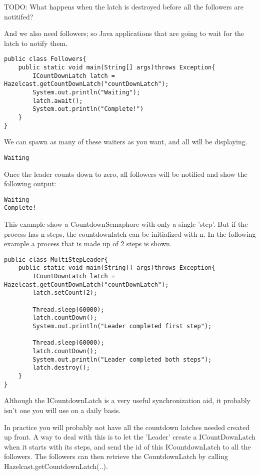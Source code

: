 TODO: What happens when the latch is destroyed before all the followers are notitifed?

And we also need followers; so Java applications that are going to wait for the 
latch to notify them.

\begin{verbatim}
public class Followers{
    public static void main(String[] args)throws Exception{
        ICountDownLatch latch = Hazelcast.getCountDownLatch("countDownLatch");
        System.out.println("Waiting");
        latch.await();
        System.out.println("Complete!")
    }
}
\end{verbatim}
We can spawn as many of these waiters as you want, and all will be displaying.

\begin{verbatim}
Waiting
\end{verbatim}

Once the leader counts down to zero, all followers will be notified and show the following output:

\begin{verbatim}
Waiting
Complete!
\end{verbatim}

This example show a CountdownSemaphore with only a single 'step'. But if the process has n steps,
the countdownlatch can be initialized with n. In the following example a process that is made up of 2 steps is shown.

\begin{verbatim}
public class MultiStepLeader{
    public static void main(String[] args)throws Exception{
        ICountDownLatch latch = Hazelcast.getCountDownLatch("countDownLatch");
        latch.setCount(2);

        Thread.sleep(60000); 
        latch.countDown();
        System.out.println("Leader completed first step");
        
        Thread.sleep(60000); 
        latch.countDown();
        System.out.println("Leader completed both steps");
        latch.destroy();
    }
}
\end{verbatim}

Although the ICountdownLatch is a very useful synchronization aid, it probably isn't one
you will use on a daily basis.

In practice you will probably not have all the countdown latches needed created up front.
A way to deal with this is to let the 'Leader' create a ICountDownLatch when it starts with
its steps, and send the id of this ICountdownLatch to all the followers. The followers can 
then retrieve the CountdownLatch by calling Hazelcast.getCountdownLatch(..).

